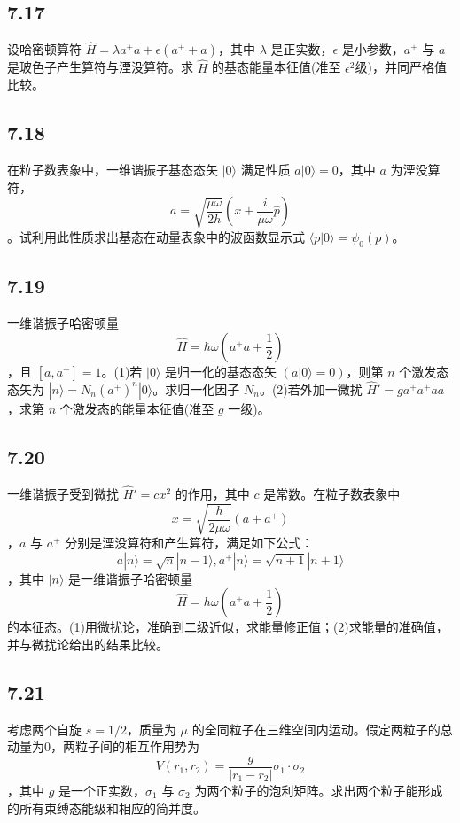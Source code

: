 \subsection{7.17}
设哈密顿算符 $\hat{H} = \lambda a^+a + \epsilon(a^++a)$，其中 $\lambda$ 是正实数，$\epsilon$ 是小参数，$a^+$ 与 $a$ 是玻色子产生算符与湮没算符。求 $\hat{H}$ 的基态能量本征值(准至 $\epsilon^2$级)，并同严格值比较。

\subsection{7.18}
在粒子数表象中，一维谐振子基态态矢 $|0\rangle$ 满足性质 $a|0\rangle = 0$，其中 $a$ 为湮没算符，$$a = \sqrt{\frac{\mu\omega}{2h}}\left(x + \frac{i}{\mu\omega}\hat{p}\right)$$。试利用此性质求出基态在动量表象中的波函数显示式 $\langle p|0\rangle = \psi_0(p)$。

\subsection{7.19}
一维谐振子哈密顿量 $$\hat{H} = \hbar \omega \left( a^+ a + \frac{1}{2} \right)$$，且 $[a, a^+] = 1$。(1)若 $|0\rangle$ 是归一化的基态态矢 $(a | 0\rangle = 0)$，则第 $n$ 个激发态态矢为 $|n\rangle = N_n (a^+)^n |0\rangle$。求归一化因子 $N_n$。(2)若外加一微扰 $\hat{H}' = ga^+ a^+ a a$，求第 $n$ 个激发态的能量本征值(准至 $g$ 一级)。

\subsection{7.20}
一维谐振子受到微扰 $\hat{H}' = cx^2$ 的作用，其中 $c$ 是常数。在粒子数表象中 $$x = \sqrt{\frac{h}{2\mu\omega}} (a+a^+)$$，$a$ 与 $a^+$ 分别是湮没算符和产生算符，满足如下公式：$$a|n\rangle = \sqrt{n}|n-1\rangle,  a^+|n\rangle = \sqrt{n+1}|n+1\rangle$$，其中 $|n\rangle$ 是一维谐振子哈密顿量 $$\hat{H} = h\omega \left( a^+ a + \frac{1}{2} \right)$$ 的本征态。(1)用微扰论，准确到二级近似，求能量修正值；(2)求能量的准确值，并与微扰论给出的结果比较。

\subsection{7.21}
考虑两个自旋 $s = 1/2$，质量为 $\mu$ 的全同粒子在三维空间内运动。假定两粒子的总动量为0，两粒子间的相互作用势为 $$V(r_1, r_2) = \frac{g}{|r_1 - r_2|} \sigma_1 \cdot \sigma_2$$，其中 $g$ 是一个正实数，$\sigma_1$ 与 $\sigma_2$ 为两个粒子的泡利矩阵。求出两个粒子能形成的所有束缚态能级和相应的简并度。

